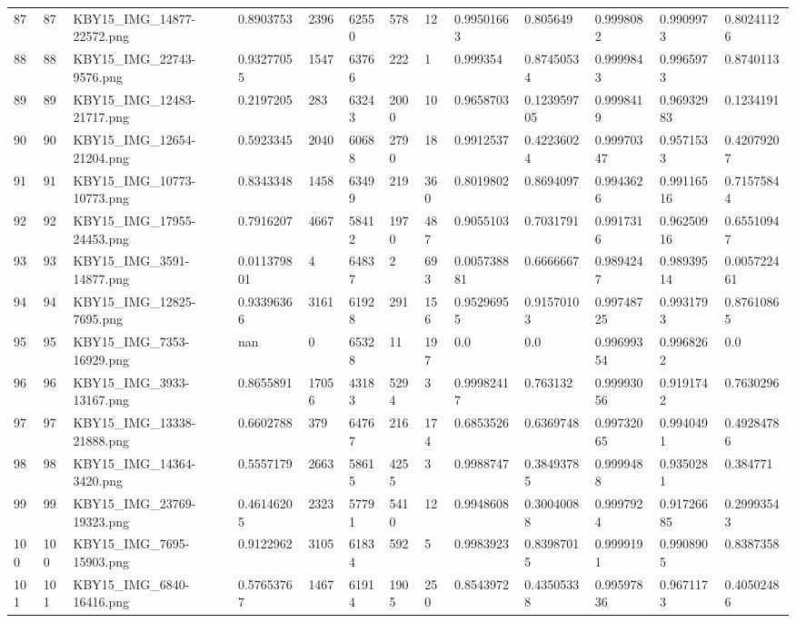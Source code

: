 \documentclass[11pt, a4paper, twoside]{report}
\begin{document}
\begin{longtable}[c]{@{}lllllllllllll@{}}
87 & 87 & KBY15\_IMG\_14877-22572.png & 0.8903753 & 2396 & 62550 & 578 & 12 & 0.99501663 & 0.805649 & 0.9998082 & 0.9909973 & 0.80241126 \\
88 & 88 & KBY15\_IMG\_22743-9576.png & 0.93277055 & 1547 & 63766 & 222 & 1 & 0.999354 & 0.87450534 & 0.9999843 & 0.9965973 & 0.8740113 \\
89 & 89 & KBY15\_IMG\_12483-21717.png & 0.2197205 & 283 & 63243 & 2000 & 10 & 0.9658703 & 0.123959705 & 0.9998419 & 0.96932983 & 0.1234191 \\
90 & 90 & KBY15\_IMG\_12654-21204.png & 0.5923345 & 2040 & 60688 & 2790 & 18 & 0.9912537 & 0.42236024 & 0.99970347 & 0.9571533 & 0.42079207 \\
91 & 91 & KBY15\_IMG\_10773-10773.png & 0.8343348 & 1458 & 63499 & 219 & 360 & 0.8019802 & 0.8694097 & 0.9943626 & 0.99116516 & 0.71575844 \\
92 & 92 & KBY15\_IMG\_17955-24453.png & 0.7916207 & 4667 & 58412 & 1970 & 487 & 0.9055103 & 0.7031791 & 0.9917316 & 0.96250916 & 0.65510947 \\
93 & 93 & KBY15\_IMG\_3591-14877.png & 0.011379801 & 4 & 64837 & 2 & 693 & 0.005738881 & 0.6666667 & 0.9894247 & 0.98939514 & 0.005722461 \\
94 & 94 & KBY15\_IMG\_12825-7695.png & 0.93396366 & 3161 & 61928 & 291 & 156 & 0.95296955 & 0.91570103 & 0.99748725 & 0.9931793 & 0.87610865 \\
95 & 95 & KBY15\_IMG\_7353-16929.png & nan & 0 & 65328 & 11 & 197 & 0.0 & 0.0 & 0.99699354 & 0.9968262 & 0.0 \\
96 & 96 & KBY15\_IMG\_3933-13167.png & 0.8655891 & 17056 & 43183 & 5294 & 3 & 0.99982417 & 0.763132 & 0.99993056 & 0.9191742 & 0.7630296 \\
97 & 97 & KBY15\_IMG\_13338-21888.png & 0.6602788 & 379 & 64767 & 216 & 174 & 0.6853526 & 0.6369748 & 0.99732065 & 0.9940491 & 0.49284786 \\
98 & 98 & KBY15\_IMG\_14364-3420.png & 0.5557179 & 2663 & 58615 & 4255 & 3 & 0.9988747 & 0.38493785 & 0.9999488 & 0.9350281 & 0.384771 \\
99 & 99 & KBY15\_IMG\_23769-19323.png & 0.46146205 & 2323 & 57791 & 5410 & 12 & 0.9948608 & 0.30040088 & 0.9997924 & 0.91726685 & 0.29993543 \\
100 & 100 & KBY15\_IMG\_7695-15903.png & 0.9122962 & 3105 & 61834 & 592 & 5 & 0.9983923 & 0.83987015 & 0.9999191 & 0.9908905 & 0.8387358 \\
101 & 101 & KBY15\_IMG\_6840-16416.png & 0.57653767 & 1467 & 61914 & 1905 & 250 & 0.8543972 & 0.43505338 & 0.99597836 & 0.9671173 & 0.40502486 \\

\end{longtable}
\end{document}

